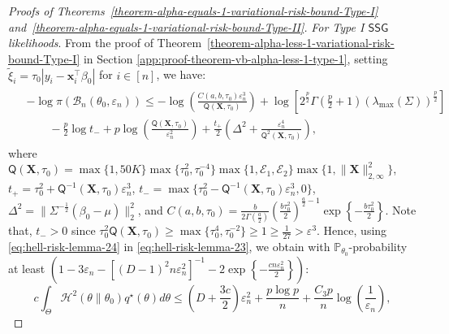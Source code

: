 \documentclass[12pt]{article}
\numberwithin{equation}{section}
\newcommand{\ssg}{\mathsf{SSG}}
\begin{document}
\begin{proof}[Proofs of Theorems~\ref{theorem-alpha-equals-1-variational-risk-bound-Type-I} and~\ref{theorem-alpha-equals-1-variational-risk-bound-Type-II}]
\textit{For Type I $\ssg$ likelihoods}. From the proof of Theorem~\ref{theorem-alpha-less-1-variational-risk-bound-Type-I} in Section \ref{app:proof-theorem-vb-alpha-less-1-type-1}, setting $\tilde{\xi}_i = \tau_0|y_i - \mathbf{x}_i^{\top}\beta_0|$ for $i\in [n]$, we have:
\begin{align}\label{eq:hell-risk-lemma-24}
    \begin{split}
        &-\log \pi(\mathcal{B}_n(\theta_0, \varepsilon_n)) 
        \leq -\log\left(\frac{C(a,b,\tau_0)\varepsilon_n^3}{\mathsf{Q}(\mathbf{X}, \tau_0)}\right)  + \log\left[2^{\frac{p}{2}}\Gamma\left(\frac{p}{2}+1\right)\left(\lambda_{\mathrm{max}}(\Sigma)\right)^{\frac{p}{2}}\right]\\
        &\qquad - \frac{p}{2}\log t_{-} + p\log\left(\frac{\mathsf{Q}(\mathbf{X}, \tau_0)}{\varepsilon_n^2}\right) + \frac{t_{+}}{2}\left(\Delta^2 + \frac{\varepsilon_n^4}{\mathsf{Q}^{2}(\mathbf{X}, \tau_0)}\right),
    \end{split}
\end{align}
%
where { $\mathsf{Q}(\mathbf{X}, \tau_0) = \max\{1, 50K\}\max\{\tau_0^2, \tau_0^{-4}\}\max\{1, \mathscr{E}_1, \mathscr{E}_2\}\max\{1, \lVert \mathbf X \rVert_{2, \infty}^2\}$}, 
$t_+ = \tau_0^2 + \mathsf{Q}^{-1}(\mathbf{X}, \tau_0)\varepsilon_n^3$, $t_{-} = \max\{\tau_0^2 - \mathsf{Q}^{-1}(\mathbf{X}, \tau_0)\varepsilon_n^3, 0\}$, $\Delta^{2} = \lVert \Sigma^{-\frac{1}{2}}(\beta_0-\mu)\rVert_{2}^{2}$, and $C(a,b,\tau_0) = \frac{b}{2\Gamma\left(\frac{a}{2}\right)}\left(\frac{b \tau_0^2}{2}\right)^{\frac{a}{2}-1}\exp\left\{-\frac{b\tau_0^2}{2}\right\}$. Note that, $t_{-} > 0$ since $\tau_0^{2}\mathsf{Q}(\mathbf{X}, \tau_0) \geq \max\{\tau_0^{4}, \tau_0^{-2}\}\geq 1 \geq \tfrac{1}{27} > \varepsilon^{3}$. Hence, using \eqref{eq:hell-risk-lemma-24} in \eqref{eq:hell-risk-lemma-23}, we obtain with $\mathbb{P}_{\theta_0}$-probability at least $\left(1 - 3\varepsilon_n - [(D-1)^2n\varepsilon_n^2]^{-1} - 2\exp\left\{-\tfrac{c n \varepsilon_n^2}{2}\right\}\right)$:
\begin{equation}\label{eq:hell-risk-lemma-25}
\boxed{c\int_{\Theta}\mathcal{H}^{2}(\theta \parallel \theta_0) q^{\star}(\theta)d\theta \leq \left(D + \frac{3c}{2}\right)\varepsilon_n^2 + \frac{p\log p}{n} + \frac{C_3 p}{n}\log\left(\frac{1}{\varepsilon_n}\right)},

\end{equation}
\end{proof}
\end{document}
